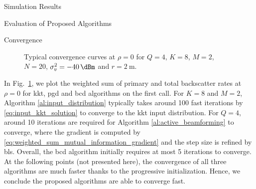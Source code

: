 \documentclass[journal]{IEEEtran}
\begin{document}
\begin{section}{Simulation Results}
\begin{subsection}{Evaluation of Proposed Algorithms}
		\begin{subsubsection}{Convergence}
			\begin{figure}[!t]
				\centering
				\resizebox{0.75\columnwidth}{!}{
					
				}
				\caption{Typical convergence curves at $\rho=0$ for $Q=4$, $K=8$, $M=2$, $N=20$, $\sigma_v^2=\qty{-40}{\dBm}$ and $r=\qty{2}{\meter}$.}
				\label{fg:wsr_convergence}
			\end{figure}

			In Fig.~\ref{fg:wsr_convergence}, we plot the weighted sum of primary and total backscatter rates at $\rho=0$ for \gls{kkt}, \gls{pgd} and \gls{bcd} algorithms on the first call.
			For $K=8$ and $M=2$, Algorithm \ref{al:input_distribution} typically takes around \num{100} fast iterations by \eqref{eq:input_kkt_solution} to converge to the \gls{kkt} input distribution.
			For $Q=4$, around \num{10} iterations are required for Algorithm \ref{al:active_beamforming} to converge, where the gradient is computed by \eqref{eq:weighted_sum_mutual_information_gradient} and the step size is refined by \gls{bls}.
			Overall, the \gls{bcd} algorithm initially requires at most \num{5} iterations to converge.
			At the following points (not presented here), the convergence of all three algorithms are much faster thanks to the progressive initialization.
			Hence, we conclude the proposed algorithms are able to converge fast.
		\end{subsubsection}
	\end{subsection}


\end{section}
\end{document}

